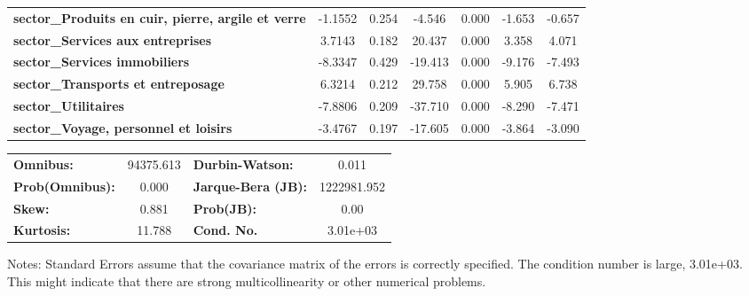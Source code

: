 \begin{center}
\begin{tabular}{lcccccc}
\textbf{sector\_Produits en cuir, pierre, argile et verre}            &      -1.1552  &        0.254     &    -4.546  &         0.000        &       -1.653    &       -0.657     \\
\textbf{sector\_Services aux entreprises}                             &       3.7143  &        0.182     &    20.437  &         0.000        &        3.358    &        4.071     \\
\textbf{sector\_Services immobiliers}                                 &      -8.3347  &        0.429     &   -19.413  &         0.000        &       -9.176    &       -7.493     \\
\textbf{sector\_Transports et entreposage}                            &       6.3214  &        0.212     &    29.758  &         0.000        &        5.905    &        6.738     \\
\textbf{sector\_Utilitaires}                                          &      -7.8806  &        0.209     &   -37.710  &         0.000        &       -8.290    &       -7.471     \\
\textbf{sector\_Voyage, personnel et loisirs}                         &      -3.4767  &        0.197     &   -17.605  &         0.000        &       -3.864    &       -3.090     \\
\bottomrule
\end{tabular}
\begin{tabular}{lclc}
\textbf{Omnibus:}       & 94375.613 & \textbf{  Durbin-Watson:     } &      0.011   \\
\textbf{Prob(Omnibus):} &    0.000  & \textbf{  Jarque-Bera (JB):  } & 1222981.952  \\
\textbf{Skew:}          &    0.881  & \textbf{  Prob(JB):          } &       0.00   \\
\textbf{Kurtosis:}      &   11.788  & \textbf{  Cond. No.          } &   3.01e+03   \\
\bottomrule
\end{tabular}
\end{center}

Notes: \newline
 [1] Standard Errors assume that the covariance matrix of the errors is correctly specified. \newline
 [2] The condition number is large, 3.01e+03. This might indicate that there are \newline
 strong multicollinearity or other numerical problems.